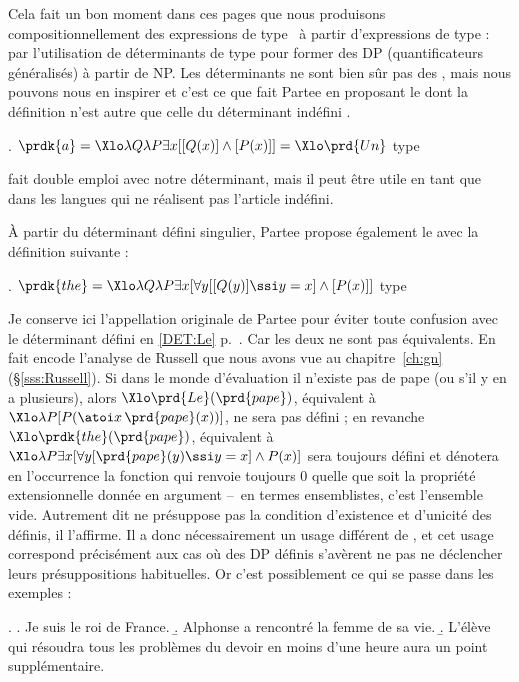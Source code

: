 Cela fait un bon moment dans ces pages que nous produisons compositionnellement des expressions de type \ett\ à partir d'expressions de type {\et} :  par l'utilisation de déterminants de type \type{\et,\ett} pour former des DP (quantificateurs généralisés) à partir de NP.  Les déterminants ne sont bien sûr pas des , mais nous pouvons nous en inspirer et c'est ce que fait Partee en proposant le   dont la définition n'est autre que celle du déterminant indéfini .

\ex.
\(\prdk{a} = {\Xlo\lambda Q\lambda P \exists x [[Q(x)] \wedge [P(x)]]} = {\Xlo\prd{Un}} \)
\hfill type \type{\et,\ett}


 fait double emploi avec notre déterminant, mais il peut être utile en tant que  dans les langues qui ne réalisent pas l'article indéfini.  

À partir du déterminant défini singulier, Partee propose également le   avec la définition suivante :

\ex.
\(\prdk{the} = \Xlo\lambda Q\lambda P\exists x[\forall y [[Q(y)] \ssi y=x]\wedge [P(x)]]\)
\hfill type \type{\et,\ett}


Je conserve ici l'appellation originale  de Partee pour éviter toute confusion avec le déterminant  défini en \ref{DET:Le} p.~\pageref{DET:Le}.  Car les deux ne sont pas équivalents.  En fait  encode l'analyse de Russell que nous avons vue au chapitre~\ref{ch:gn} (\S\ref{sss:Russell}). Si dans le monde d'évaluation il n'existe pas de pape (ou s'il y en a plusieurs), alors $\Xlo\prd{Le}(\prd{pape})$, équivalent à $\Xlo\lambda P[P(\atoi x\,\prd{pape}(x))]$, ne sera pas défini ; en revanche $\Xlo\prdk{the}(\prd{pape})$, équivalent à $\Xlo\lambda P\exists x[\forall y [\prd{pape}(y) \ssi y=x]\wedge P(x)]$ sera toujours défini et dénotera en l'occurrence la fonction qui renvoie toujours $0$ quelle que soit la propriété extensionnelle donnée en argument --~en termes ensemblistes, c'est l'ensemble vide. 
Autrement dit  ne présuppose pas  la condition d'existence et d'unicité des définis, il l'affirme.  Il a donc nécessairement un usage différent de , et cet usage correspond précisément aux cas où des DP définis s'avèrent ne pas ne déclencher leurs présuppositions habituelles.
Or c'est possiblement ce qui se passe dans les exemples {\Next} :


\ex.
\a. Je suis le roi de France.\label{x:jesuisleroi}
\b. Alphonse a rencontré la femme de sa vie.
\b. L'élève qui résoudra tous les problèmes du devoir en moins d'une heure aura un point supplémentaire.


